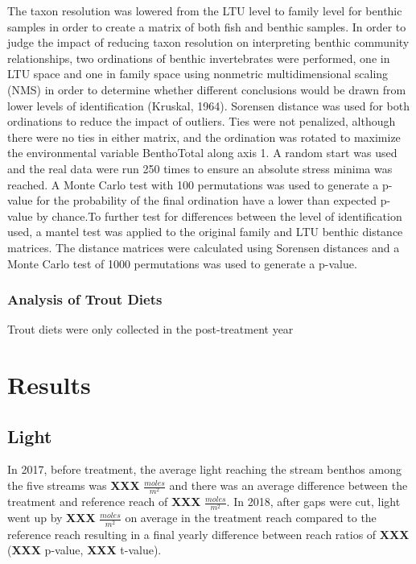 \documentclass[double,12pt]{beavtex}
\begin{document}
  The taxon resolution was lowered from the LTU level to family level for
  benthic samples in order to create a matrix of both fish and benthic
  samples. In order to judge the impact of reducing taxon resolution on
  interpreting benthic community relationships, two ordinations of benthic
  invertebrates were performed, one in LTU space and one in family space
  using nonmetric multidimensional scaling (NMS) in order to determine
  whether different conclusions would be drawn from lower levels of
  identification (Kruskal, 1964). Sorensen distance was used for both
  ordinations to reduce the impact of outliers. Ties were not penalized,
  although there were no ties in either matrix, and the ordination was
  rotated to maximize the environmental variable BenthoTotal along axis 1.
  A random start was used and the real data were run 250 times to ensure
  an absolute stress minima was reached. A Monte Carlo test with 100
  permutations was used to generate a p-value for the probability of the
  final ordination have a lower than expected p-value by chance.To further
  test for differences between the level of identification used, a mantel
  test was applied to the original family and LTU benthic distance
  matrices. The distance matrices were calculated using Sorensen distances
  and a Monte Carlo test of 1000 permutations was used to generate a
  p-value.
  
  \subsection*{Analysis of Trout Diets}\label{analysis-of-trout-diets}
  
  Trout diets were only collected in the post-treatment year
  
  \chapter*{Results}\label{results}
  
  \section*{Light}\label{light-1}
  
  In 2017, before treatment, the average light reaching the stream benthos
  among the five streams was \textbf{XXX} \(\frac{moles}{m^2}\) and there
  was an average difference between the treatment and reference reach of
  \textbf{XXX} \(\frac{moles}{m^2}\). In 2018, after gaps were cut, light
  went up by \textbf{XXX} \(\frac{moles}{m^2}\) on average in the
  treatment reach compared to the reference reach resulting in a final
  yearly difference between reach ratios of \textbf{XXX} (\textbf{XXX}
  p-value, \textbf{XXX} t-value).
  
\end{document}
